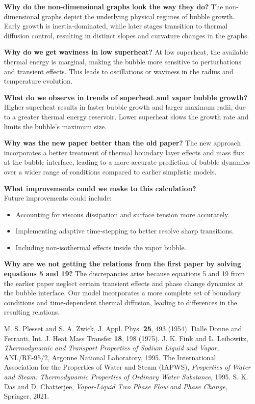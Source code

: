 \documentclass[aps,pre,twocolumn,superscriptaddress,floatfix]{revtex4-2}
\begin{document}
\textbf{Why do the non-dimensional graphs look the way they do?}
The non-dimensional graphs depict the underlying physical regimes of bubble growth. Early growth is inertia-dominated, while later stages transition to thermal diffusion control, resulting in distinct slopes and curvature changes in the graphs.

\textbf{Why do we get waviness in low superheat?}
At low superheat, the available thermal energy is marginal, making the bubble more sensitive to perturbations and transient effects. This leads to oscillations or waviness in the radius and temperature evolution.

\textbf{What do we observe in trends of superheat and vapor bubble growth?}
Higher superheat results in faster bubble growth and larger maximum radii, due to a greater thermal energy reservoir. Lower superheat slows the growth rate and limits the bubble's maximum size.

\textbf{Why was the new paper better than the old paper?}
The new approach incorporates a better treatment of thermal boundary layer effects and mass flux at the bubble interface, leading to a more accurate prediction of bubble dynamics over a wider range of conditions compared to earlier simplistic models.

\textbf{What improvements could we make to this calculation?}
\\Future improvements could include:
\begin{itemize}
    \item Accounting for viscous dissipation and surface tension more accurately.
    \item Implementing adaptive time-stepping to better resolve sharp transitions.
    \item Including non-isothermal effects inside the vapor bubble.
\end{itemize}

\textbf{Why are we not getting the relations from the first paper by solving equations 5 and 19?}
The discrepancies arise because equations 5 and 19 from the earlier paper neglect certain transient effects and phase change dynamics at the bubble interface. Our model incorporates a more complete set of boundary conditions and time-dependent thermal diffusion, leading to differences in the resulting relations.

\begin{thebibliography}{99}
 M. S. Plesset and S. A. Zwick, J. Appl. Phys. \textbf{25}, 493 (1954).
 Dalle Donne and Ferranti, Int. J. Heat Mass Transfer \textbf{18}, 198 (1975).
 J. K. Fink and L. Leibowitz, \textit{Thermodynamic and Transport Properties of Sodium Liquid and Vapor}, ANL/RE-95/2, Argonne National Laboratory, 1995.
 The International Association for the Properties of Water and Steam (IAPWS), \textit{Properties of Water and Steam: Thermodynamic Properties of Ordinary Water Substance}, 1995.
 S. K. Das and D. Chatterjee, \textit{Vapor-Liquid Two Phase Flow and Phase Change}, Springer, 2021.
\end{thebibliography}
\end{document}
